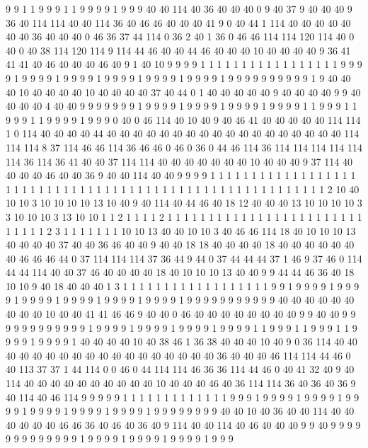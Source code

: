 9 9 1 1 9 9 9 1 1 9 9 9 9 1 9 9 9 40 40 114
40 36 40 40 40 0 9 40 37 9 40 40 40 9 36 40 114 114 40 40
114 36 40 46 46 40 40 40 41 9 0 40 44 1 114 40 40 40 40 40
40 40 36 40 40 40 0 46 36 37 44 114 0 36 2 40 1 36 0 46
46 114 114 120 114 40 0 40 0 40 38 114 120 114 9 114 44 46 40 40
44 46 40 40 40 10 40 40 40 40 9 36 41 41 41 40 46 40 40 40
46 40 9 1 40 10 9 9 9 9 1 1 1 1 1 1 1 1 1 1
1 1 1 1 1 1 1 9 9 9 9 1 9 9 9 9 1 9 9 9
9 1 9 9 9 9 1 9 9 9 9 1 9 9 9 9 1 9 9 9
9 9 9 9 9 9 9 1 9 40 40 40 10 40 40 40 40 10 40 40
40 40 37 40 44 0 1 40 40 40 40 40 9 40 40 40 40 9 9 40
40 40 40 4 40 40 9 9 9 9 9 9 9 1 9 9 9 9 1 9
9 9 9 1 9 9 9 9 1 9 9 9 9 1 1 9 9 9 1 1
9 9 9 1 1 9 9 9 9 1 9 9 9 0 40 0 46 114 40 10
40 9 40 46 41 40 40 40 40 40 114 114 1 0 114 40 40 40 40 44
40 40 40 40 40 40 40 40 40 40 40 40 40 40 40 40 40 40 114 114
114 8 37 114 46 46 114 36 46 46 0 46 0 36 0 44 46 114 36 114
114 114 114 114 114 36 114 36 41 40 40 37 114 114 40 40 40 40 40 40
40 10 40 40 40 9 37 114 40 40 40 40 46 40 40 36 9 40 40 114
40 40 9 9 9 9 1 1 1 1 1 1 1 1 1 1 1 1 1 1
1 1 1 1 1 1 1 1 1 1 1 1 1 1 1 1 1 1 1 1
1 1 1 1 1 1 1 1 1 1 1 1 1 1 1 1 1 1 1 1
1 1 1 2 10 40 10 10 3 10 10 10 10 13 10 40 9 40 114 40
44 46 40 18 12 40 40 40 13 10 10 10 10 3 3 10 10 10 3 13
10 10 1 1 2 1 1 1 1 2 1 1 1 1 1 1 1 1 1 1
1 1 1 1 1 1 1 1 1 1 1 1 1 1 1 1 1 1 1 2
3 1 1 1 1 1 1 1 10 10 13 40 40 10 10 3 40 46 46 114
18 40 10 10 10 13 40 40 40 40 37 40 40 36 46 40 40 9 40 40
18 18 40 40 40 40 18 40 40 40 40 40 40 40 46 46 46 44 0 37
114 114 114 37 36 44 9 44 0 37 44 44 44 37 1 46 9 37 46 0
114 44 44 114 40 40 37 46 40 40 40 40 18 40 10 10 10 13 40 40
9 9 44 44 46 36 40 18 10 10 9 40 18 40 40 40 1 3 1 1
1 1 1 1 1 1 1 1 1 1 1 1 1 1 1 1 9 9 1 9
9 9 9 1 9 9 9 9 1 9 9 9 9 1 9 9 9 9 1 9
9 9 9 1 9 9 9 9 1 9 9 9 9 9 9 9 9 9 9 9
40 40 40 40 40 40 40 40 40 10 40 40 41 41 46 46 9 40 40 0
46 40 40 40 40 40 40 40 40 9 9 40 40 9 9 9 9 9 9 9
9 9 9 9 9 1 9 9 9 9 1 9 9 9 9 1 9 9 9 9
1 9 9 9 9 1 1 9 9 9 1 1 9 9 9 1 1 9 9 9
9 1 9 9 9 9 1 40 40 40 40 10 40 38 46 1 36 38 40 40
40 10 40 9 0 36 114 40 40 40 40 40 40 40 40 40 40 40 40 40
40 40 40 40 40 36 40 40 40 46 114 114 44 46 0 40 113 37 37 1
44 114 0 0 46 0 44 114 114 46 36 36 114 44 46 0 40 41 32 40
9 40 114 40 40 40 40 40 40 40 40 40 40 10 40 40 40 46 40 36
114 114 36 40 36 40 36 9 40 114 40 46 114 9 9 9 9 9 1 1
1 1 1 1 1 1 1 1 1 1 1 9 9 9 1 9 9 9 9 1
9 9 9 9 1 9 9 9 9 1 9 9 9 9 1 9 9 9 9 1
9 9 9 9 1 9 9 9 9 9 9 9 9 40 40 10 40 36 40 40
114 40 40 40 40 40 40 46 46 36 40 46 40 36 40 9 114 40 40 114
40 46 40 40 40 9 9 40 9 9 9 9 9 9 9 9 9 9 9 9
9 1 9 9 9 9 1 9 9 9 9 1 9 9 9 9 1 9 9 9
